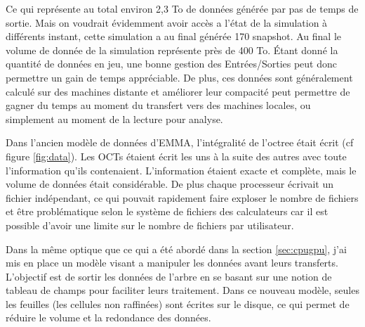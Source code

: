 Ce qui représente au total environ 2,3 To de données générée par pas de temps de sortie.
Mais on voudrait évidemment avoir accès a l'état de la simulation à différents instant, cette simulation a au final générée 170 snapshot.
Au final le volume de donnée de la simulation représente près de 400 To.
Étant donné la quantité de données en jeu, une bonne gestion des Entrées/Sorties peut donc permettre un gain de temps appréciable.
De plus, ces données sont généralement calculé sur des machines distante et améliorer leur compacité peut permettre de gagner du temps au moment du transfert vers des machines locales, ou simplement au moment de la lecture pour analyse.


Dans l'ancien modèle de données d'EMMA, l'intégralité de l'octree était écrit (cf figure \ref{fig:data}).
Les OCTs étaient écrit les uns à la suite des autres avec toute l'information qu'ils contenaient.
L'information étaient exacte et complète, mais le volume de données était considérable.
De plus chaque processeur écrivait un fichier indépendant, ce qui pouvait rapidement faire exploser le nombre de fichiers et être problématique selon le système de fichiers des calculateurs car il est possible d'avoir une limite sur le nombre de fichiers par utilisateur.

Dans la même optique que ce qui a été abordé dans la section \ref{sec:cpugpu}, j'ai mis en place un modèle visant a manipuler les données avant leurs transferts.
L'objectif est de sortir les données de l'arbre en se basant sur une notion de tableau de champs pour faciliter leurs traitement.
Dans ce nouveau modèle, seules les feuilles (les cellules non raffinées) sont écrites sur le disque, ce qui permet de réduire le volume et la redondance des données.

